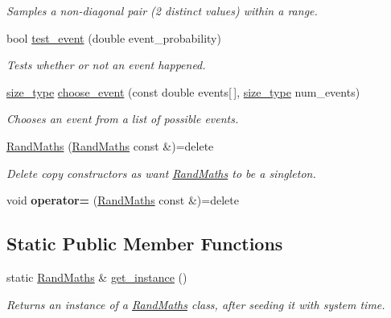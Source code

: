 \begin{DoxyCompactItemize}
\begin{DoxyCompactList}\small\item\em Samples a non-\/diagonal pair (2 distinct values) within a range. \end{DoxyCompactList}\item 
bool \mbox{\hyperlink{classrcombinator_1_1RandMaths_a183686140a9da18ad40c7e048ee8914e}{test\+\_\+event}} (double event\+\_\+probability)
\begin{DoxyCompactList}\small\item\em Tests whether or not an event happened. \end{DoxyCompactList}\item 
\mbox{\hyperlink{constants_8h_abcd18a5521fc90ff6e7b00e4fee98397}{size\+\_\+type}} \mbox{\hyperlink{classrcombinator_1_1RandMaths_a3834f9a074546f0d588247610f16fb0e}{choose\+\_\+event}} (const double events\mbox{[}$\,$\mbox{]}, \mbox{\hyperlink{constants_8h_abcd18a5521fc90ff6e7b00e4fee98397}{size\+\_\+type}} num\+\_\+events)
\begin{DoxyCompactList}\small\item\em Chooses an event from a list of possible events. \end{DoxyCompactList}\end{DoxyCompactItemize}
\textbf{ }\par
\begin{DoxyCompactItemize}
\item 
\mbox{\hyperlink{classrcombinator_1_1RandMaths_ac9b350a4aa07b739dcc2bb12c3b5c0e5}{Rand\+Maths}} (\mbox{\hyperlink{classrcombinator_1_1RandMaths}{Rand\+Maths}} const \&)=delete
\begin{DoxyCompactList}\small\item\em Delete copy constructors as want \mbox{\hyperlink{classrcombinator_1_1RandMaths}{Rand\+Maths}} to be a singleton. \end{DoxyCompactList}\item 
\mbox{\label{classrcombinator_1_1RandMaths_ab26d84d79d640cd343ac3e94a70ad184}} 
void {\bfseries operator=} (\mbox{\hyperlink{classrcombinator_1_1RandMaths}{Rand\+Maths}} const \&)=delete
\end{DoxyCompactItemize}

\subsection*{Static Public Member Functions}
\begin{DoxyCompactItemize}
\item 
static \mbox{\hyperlink{classrcombinator_1_1RandMaths}{Rand\+Maths}} \& \mbox{\hyperlink{classrcombinator_1_1RandMaths_ae54dee1a16fb0e275e1624ccaa7dc87e}{get\+\_\+instance}} ()
\begin{DoxyCompactList}\small\item\em Returns an instance of a \mbox{\hyperlink{classrcombinator_1_1RandMaths}{Rand\+Maths}} class, after seeding it with system time. \end{DoxyCompactList}\end{DoxyCompactItemize}
